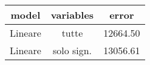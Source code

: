 \begin{table}[tb]
\centering
\begin{tabular}{| c | c | c }
  \hline
model & variables & error \\ 
  \hline
Lineare & tutte & 12664.50 \\ 
  Lineare & solo sign. & 13056.61 \\ 
   \hline
\end{tabular}
\caption{} 
\label{}
\end{table}
